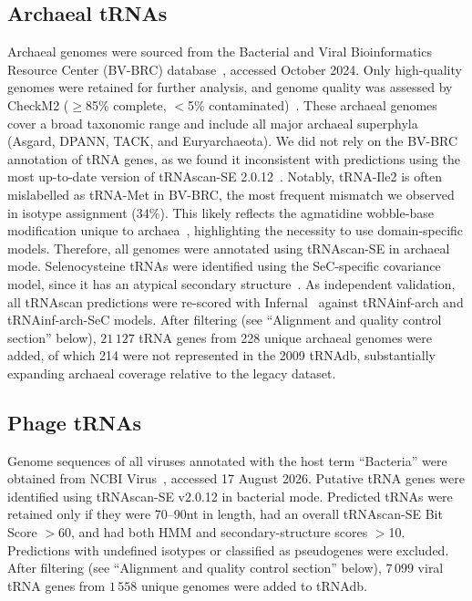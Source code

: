 \documentclass[unnumsec,webpdf,contemporary,large]{oup-authoring-template}
\begin{document}
\subsection{Archaeal tRNAs}

Archaeal genomes were sourced from the Bacterial and Viral Bioinformatics
Resource Center (BV-BRC) database~\cite{bvbrc2022}, accessed October
2024. Only high-quality genomes were retained for further analysis, and
genome quality was assessed by CheckM2 ($\geq$85\% complete, $<$5\%
contaminated)~\cite{checkm2}. These archaeal genomes cover a broad
taxonomic range and include all major archaeal superphyla (Asgard, DPANN,
TACK, and Euryarchaeota).  We did not rely on the BV-BRC annotation of tRNA
genes, as we found it inconsistent with predictions using the most
up-to-date version of tRNAscan-SE 2.0.12~\cite{tRNAscan}. Notably,
tRNA-Ile2 is often mislabelled as tRNA-Met in BV-BRC, the most frequent
mismatch we observed in isotype assignment (34\%). This likely reflects the
agmatidine wobble-base modification unique to archaea~\cite{tRNAscan},
highlighting the necessity to use domain-specific models.  Therefore, all
genomes were annotated using tRNAscan-SE in archaeal mode. Selenocysteine
tRNAs were identified using the SeC-specific covariance model, since it has
an atypical secondary structure~\cite{tRNAscan}. As independent validation,
all tRNAscan predictions were re-scored with Infernal~\cite{infernal}
against tRNAinf-arch and tRNAinf-arch-SeC models. After filtering (see
``Alignment and quality control section'' below), $21\,127$ tRNA genes from
228 unique archaeal genomes were added, of which 214 were not represented
in the 2009 tRNAdb, substantially expanding archaeal coverage relative to
the legacy dataset.

\subsection{Phage tRNAs}
Genome sequences of all viruses annotated with the host term ``Bacteria''
were obtained from NCBI Virus~\cite{ncbivirus}, accessed 17 August
2026. Putative tRNA genes were identified using tRNAscan-SE v2.0.12
\cite{tRNAscan} in bacterial mode.  Predicted tRNAs were retained only if
they were 70–90nt in length, had an overall tRNAscan-SE Bit Score $>$60,
and had both HMM and secondary-structure scores $>$10. Predictions with
undefined isotypes or classified as pseudogenes were excluded. After
filtering (see ``Alignment and quality control section'' below), $7\,099$
viral tRNA genes from $1\,558$ unique genomes were added to tRNAdb.
\end{document}
